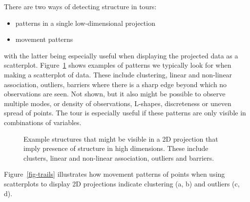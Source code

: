 \documentclass[
  letterpaper,
]{krantz}
\providecommand{\tightlist}{%
  \setlength{\itemsep}{0pt}\setlength{\parskip}{0pt}}\usepackage{longtable,booktabs,array}
\begin{document}
There are two ways of detecting structure in tours:

\begin{itemize}
\tightlist
\item
  patterns in a single low-dimensional projection
\item
  movement patterns
\end{itemize}

with the latter being especially useful when displaying the projected
data as a scatterplot. Figure~\ref{fig-example-structure} shows examples
of patterns we typically look for when making a scatterplot of data.
These include clustering, linear and non-linear association, outliers,
barriers where there is a sharp edge beyond which no observations are
seen. Not shown, but it also might be possible to observe multiple
modes, or density of observations, L-shapes, discreteness or uneven
spread of points. The tour is especially useful if these patterns are
only visible in combinations of variables.

\begin{figure}


\caption{\label{fig-example-structure}Example structures that might be
visible in a 2D projection that imply presence of structure in high
dimensions. These include clusters, linear and non-linear association,
outliers and barriers.}

\end{figure}%

Figure~\ref{fig-trails} illustrates how movement patterns of points when
using scatterplots to display 2D projections indicate clustering (a, b)
and outliers (c, d).
\end{document}
